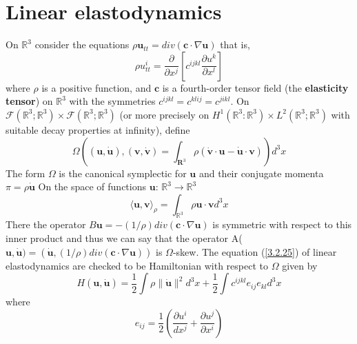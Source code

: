 
\section{Linear elastodynamics}
On $\mathbb{R}^3$ consider the equations
$\rho \mathbf{u}_{tt} = div(\mathbf{c}\cdot \nabla \mathbf{u})$
that is,
\begin{equation}\label{3.2.25}
 \rho u_{tt}^{i} = \dfrac{\partial}{\partial x^{j}}[c^{ijkl} \dfrac{\partial u^{k}}{\partial x^{l}}]
\end{equation}
where $\rho$ is a positive function, and $\mathbf{c}$ is a fourth-order tensor field (the \textbf{elasticity tensor}) 
on $\mathbb{R}^3$ with the symmetries $c^{ijkl} = c^{klij} = c^{jikl}$.
   On $\mathcal{F}(\mathbb{R}^3;\mathbb{R}^3)\times \mathcal{F}(\mathbb{R}^3;\mathbb{R}^3)$ 
   (or more precisely on 
   $H^1(\mathbb{R}^3:\mathbb{R}^3) \times L^2(\mathbb{R}^3;\mathbb{R}^3)$
   with suitable decay properties at infinity), define
   \begin{equation}
    \Omega((\mathbf{u},\dot{\mathbf{u}}),(\mathbf{v},\dot{\mathbf{v}}) = \int_{\mathbf{R}^3}\rho(
    \dot{\mathbf{v}}\cdot\mathbf{u} - \dot{\mathbf{u}}\cdot\mathbf{v}))d^3 x
   \end{equation}
The form $\Omega$ is the canonical symplectic for $\mathbf{u}$ and their conjugate momenta $\pi = \rho \dot{\mathbf{u}}$
 On the space of functions $\mathbf{u}$: $\mathbb{R}^3 \rightarrow \mathbb{R}^3$
 \begin{equation}
  \langle \mathbf{u},\mathbf{v} \rangle_{\rho} = \int_{\mathbb{R}^3} \rho \mathbf{u} \cdot \mathbf{v} d^3 x
 \end{equation}
There the operator $B\mathbf{u}= - (1/\rho)div(\mathbf{c} \cdot \nabla \mathbf{u})$ is symmetric with respect to this
inner product and thus we can say that the operator A($\mathbf{u},\dot{\mathbf{u}}) = (\dot{\mathbf{u}}, (1/\rho)div(\mathbf{c} \cdot \nabla \mathbf{u})) $
is $\Omega$-skew. The equation (\ref{3.2.25}) of linear elastodynamics are checked to be Hamiltonian with respect to 
$\Omega$ given by 
\begin{equation}
 H(\mathbf{u},\dot{\mathbf{u}}) = \dfrac{1}{2} \int \rho \|\dot{\mathbf{u}}\|^2 d^3 x + \dfrac{1}{2} \int c^{ijkl}e_{ij}e_{kl} d^3 x
\end{equation}
where 
\begin{equation*}
 e_{ij} = \dfrac{1}{2}\left( \dfrac{\partial u^{i}}{dx^{j}} + \dfrac{\partial u^{j}}{\partial x^{i}}\right)
\end{equation*}

